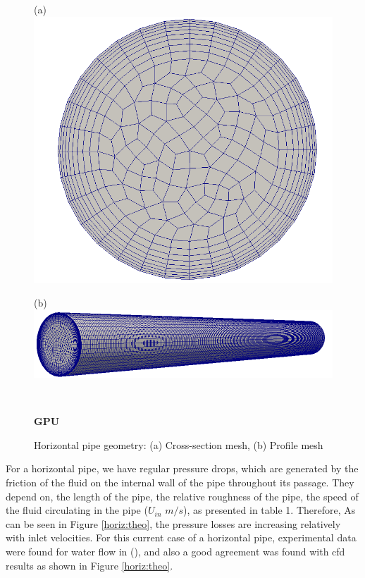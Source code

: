 \documentclass[review,3p,times,12pt]{elsarticle}
\begin{document}
\begin{minipage}[t]{0.35\textwidth}
\begin{figure}[H]
\begin{center}
(a)\includegraphics[scale =0.09]{figs/section.png}
\end{center}
\end{figure}
\end{minipage}\hfill 
\begin{minipage}[t]{0.5\textwidth}
\begin{figure}[H]
(b)\includegraphics[scale = 0.25]{figs/HP-2.png}

\end{figure}
\end{minipage}\\ 
\begin{figure}[H]
{\Large\bf GPU}
\caption{Horizontal pipe geometry: (a) Cross-section mesh, (b) Profile mesh }
\label{horiz}
\end{figure}
For a horizontal pipe, we have regular pressure drops, which are generated by the friction of the fluid on the internal wall of the pipe throughout its passage. They depend on, the length of the pipe, the relative roughness of the pipe, the speed of the fluid circulating in the pipe ($U_{in}$ $m/s$), as presented in table 1. Therefore, As can be seen in Figure \ref{horiz:theo}, the pressure losses are increasing relatively with inlet velocities. For this current case of a horizontal pipe, experimental data were found for water flow in (\citet{Randal-2004}), and also a good agreement was found with cfd results as shown in Figure \ref{horiz:theo}.\\
\end{document}
